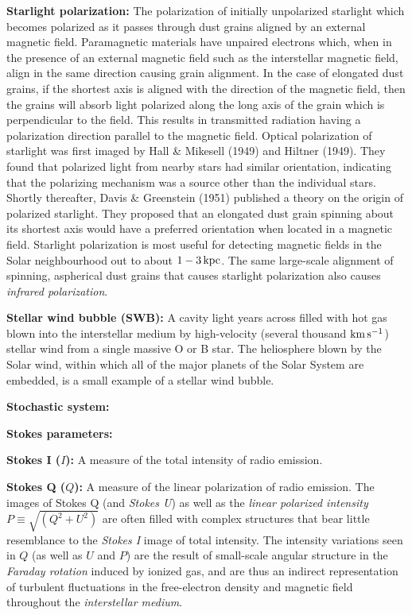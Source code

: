 \documentclass[a4paper,10pt]{article}
\begin{document}
{\noindent}\textbf{Starlight polarization:} The polarization of initially unpolarized starlight which becomes polarized as it passes through dust grains aligned by an external magnetic field. Paramagnetic materials have unpaired electrons which, when in the presence of an external magnetic field such as the interstellar magnetic field, align in the same direction causing grain alignment. In the case of elongated dust grains, if the shortest axis is aligned with the direction of the magnetic field, then the grains will absorb light polarized along the long axis of the grain which is perpendicular to the field. This results in transmitted radiation having a polarization direction parallel to the magnetic field. Optical polarization of starlight was first imaged by Hall \& Mikesell (1949) and Hiltner (1949). They found that polarized light from nearby stars had similar orientation, indicating that the polarizing mechanism was a source other than the individual stars. Shortly thereafter, Davis \& Greenstein (1951) published a theory on the origin of polarized starlight. They proposed that an elongated dust grain spinning about its shortest axis would have a preferred orientation when located in a magnetic field. Starlight polarization is most useful for detecting magnetic fields in the Solar neighbourhood out to about $1-3\,{\rm kpc}$. The same large-scale alignment of spinning, aspherical dust grains that causes starlight polarization also causes \textit{infrared polarization}.

{\noindent}\textbf{Stellar wind bubble (SWB):} A cavity light years across filled with hot gas blown into the interstellar medium by high-velocity (several thousand ${\rm km\,s^{-1}}$) stellar wind from a single massive O or B star. The heliosphere blown by the Solar wind, within which all of the major planets of the Solar System are embedded, is a small example of a stellar wind bubble.

{\noindent}\textbf{Stochastic system:}

{\noindent}\textbf{Stokes parameters:}

{\noindent}\textbf{Stokes I ($I$):} A measure of the total intensity of radio emission.

{\noindent}\textbf{Stokes Q ($Q$):} A measure of the linear polarization of radio emission. The images of Stokes Q (and \textit{Stokes U}) as well as the \textit{linear polarized intensity} $P\equiv\sqrt{(Q^2+U^2)}$ are often filled with complex structures that bear little resemblance to the \textit{Stokes I} image of total intensity. The intensity variations seen in $Q$ (as well as $U$ and $P$) are the result of small-scale angular structure in the \textit{Faraday rotation} induced by ionized gas, and are thus an indirect representation of turbulent fluctuations in the free-electron density and magnetic field throughout the \textit{interstellar medium}.
\end{document}
